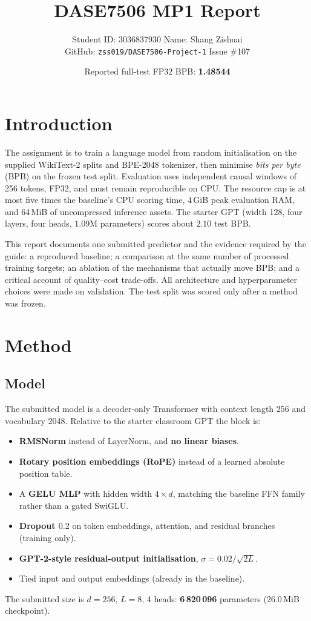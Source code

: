 \documentclass[11pt,a4paper]{article}
\title{\vspace{-8mm}DASE7506 MP1 Report\\[4pt]
}
\author{%
  Student ID: 3036837930 \quad Name: Shang Zishuai \\
  GitHub: \texttt{zss019/DASE7506-Project-1} \quad Issue \#107
}
\date{Reported full-test FP32 BPB: \textbf{1.48544}\\[2pt]}
\begin{document}
\maketitle
\vspace{-6mm}

\section{Introduction}

The assignment is to train a language model from random initialisation on the supplied WikiText-2 splits and BPE-2048 tokenizer, then minimise \emph{bits per byte} (BPB) on the frozen test split. Evaluation uses independent causal windows of 256 tokens, FP32, and must remain reproducible on CPU. The resource cap is at most five times the baseline's CPU scoring time, 4\,GiB peak evaluation RAM, and 64\,MiB of uncompressed inference assets. The starter GPT (width 128, four layers, four heads, $1.09$M parameters) scores about $2.10$ test BPB.

This report documents one submitted predictor and the evidence required by the guide: a reproduced baseline; a comparison at the same number of processed training targets; an ablation of the mechanisms that actually move BPB; and a critical account of quality--cost trade-offs. All architecture and hyperparameter choices were made on validation. The test split was scored only after a method was frozen.

\section{Method}

\subsection{Model}

The submitted model is a decoder-only Transformer with context length 256 and vocabulary 2048. Relative to the starter classroom GPT the block is:
\begin{itemize}
  \item \textbf{RMSNorm} instead of LayerNorm, and \textbf{no linear biases}.
  \item \textbf{Rotary position embeddings (RoPE)} instead of a learned absolute position table.
  \item A \textbf{GELU MLP} with hidden width $4\times d$, matching the baseline FFN family rather than a gated SwiGLU.
  \item \textbf{Dropout $0.2$} on token embeddings, attention, and residual branches (training only).
  \item \textbf{GPT-2-style residual-output initialisation}, $\sigma=0.02/\sqrt{2L}$.
  \item Tied input and output embeddings (already in the baseline).
\end{itemize}
The submitted size is $d{=}256$, $L{=}8$, 4 heads: \textbf{6\,820\,096} parameters (26.0\,MiB checkpoint).
\end{document}
